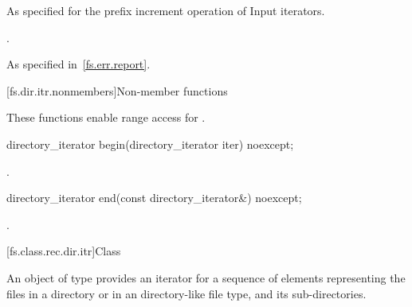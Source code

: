 \begin{itemdescr}

\pnum
\effects As specified for the prefix increment operation of
Input iterators.

\pnum
\returns {}.

\pnum
\throws As specified in~\ref{fs.err.report}.

\end{itemdescr}

[fs.dir.itr.nonmembers]{Non-member functions}

\pnum
These functions enable range access for .

%
\begin{itemdecl}
directory_iterator begin(directory_iterator iter) noexcept;
\end{itemdecl}

\begin{itemdescr}
\pnum
\returns {}.
\end{itemdescr}

%
\begin{itemdecl}
directory_iterator end(const directory_iterator&) noexcept;
\end{itemdecl}

\begin{itemdescr}
\pnum
\returns {}.
\end{itemdescr}

[fs.class.rec.dir.itr]{Class }

%
\pnum
An object of type  provides an iterator for
a sequence of  elements representing the files in a
directory or in an  directory-like file
type, and its sub-directories.

